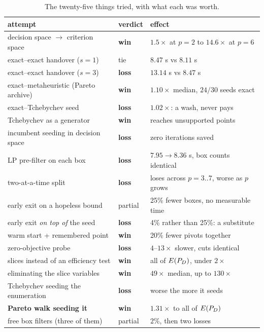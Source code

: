 \documentclass[11pt,a4paper]{article}
\begin{document}
\begin{table}[h]
\centering
\caption{The twenty-five things tried, with what each was worth.}
\begin{tabular}{lll}
\toprule
attempt & verdict & effect \\
\midrule
decision space $\to$ criterion space & \textbf{win}  & $1.5\times$ at $p=2$ to $14.6\times$ at $p=6$ \\
exact--exact handover ($s=1$)        & tie           & $8.47$ s vs $8.11$ s \\
exact--exact handover ($s=3$)        & \textbf{loss} & $13.14$ s vs $8.47$ s \\
exact--metaheuristic (Pareto archive)& \textbf{win}  & $1.10\times$ median, $24/30$ seeds exact \\
exact--Tchebychev seed               & \textbf{loss} & $1.02\times$: a wash, never pays \\
Tchebychev as a generator            & \textbf{win}  & reaches unsupported points \\
incumbent seeding in decision space  & \textbf{loss} & zero iterations saved \\
LP pre-filter on each box            & \textbf{loss} & $7.95 \to 8.36$ s, box counts identical \\
two-at-a-time split                  & \textbf{loss} & loses across $p=3..7$, worse as $p$ grows \\
early exit on a hopeless bound       & partial       & 25\% fewer boxes, no measurable time \\
early exit \emph{on top of} the seed & \textbf{loss} & 4\% rather than 25\%: a substitute \\
warm start + remembered point        & \textbf{win}  & 20\% fewer pivots together \\
zero-objective probe                 & \textbf{loss} & $4$--$13\times$ slower, cuts identical \\
slices instead of an efficiency test  & \textbf{win}  & all of $E(P_{D})$, under $2\times$ \\
eliminating the slice variables       & \textbf{win}  & $49\times$ median, up to $130\times$ \\
Tchebychev seeding the enumeration    & \textbf{loss} & worse the more it seeds \\
\textbf{Pareto walk seeding it}              & \textbf{win}  & $\mathbf{1.31\times}$ to all of $E(P_{D})$ \\
free box filters (three of them)      & partial       & $2\%$, then two losses \\

\end{tabular}
\end{table}
\end{document}
